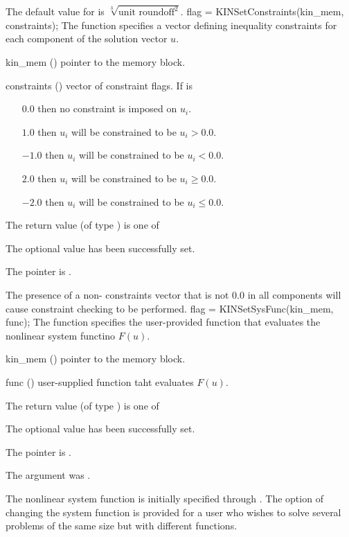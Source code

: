 {
  The default value for \id{} is $\sqrt[3]{\text{unit roundoff}^2}$.
}
{
flag = KINSetConstraints(kin\_mem, constraints);
}
{
  The function  specifies a vector defining
  inequality constraints for each component of the solution vector $u$.
}
{
  \begin{args}[constraints]
  \item[kin\_mem] ()
    pointer to the {\kinsol} memory block.
  \item[constraints] ()
    vector of constraint flags. If  is
    \begin{itemize}    
    \item[$0.0$] then no constraint is imposed on $u_i$. 
    \item[$1.0$] then $u_i$ will be constrained to be $u_i > 0.0$.
    \item[$-1.0$] then $u_i$ will be constrained to be $u_i < 0.0$.
    \item[$2.0$] then $u_i$ will be constrained to be $u_i \ge 0.0$.
    \item[$-2.0$] then $u_i$ will be constrained to be $u_i \le 0.0$.
    \end{itemize}
  \end{args}
}
{
  The return value  (of type ) is one of
  \begin{args}
  \item[\Id{KIN\_SUCCESS}] 
    The optional value has been successfully set.
  \item[\Id{KIN\_MEM\_NULL}]
    The  pointer is .
  \end{args}
}
{
  The presence of a non- constraints vector that is not $0.0$ in
  all components will cause constraint checking to be performed.
}
{
flag = KINSetSysFunc(kin\_mem, func);
}
{
  The function  specifies the user-provided function
  that evaluates the nonlinear system functino $F(u)$.
}
{
  \begin{args}
  \item[kin\_mem] ()
    pointer to the {\kinsol} memory block.
  \item[func] ()
    user-supplied function taht evaluates $F(u)$.
  \end{args}
}
{
  The return value  (of type ) is one of
  \begin{args}
  \item[\Id{KIN\_SUCCESS}] 
    The optional value has been successfully set.
  \item[\Id{KIN\_MEM\_NULL}]
    The  pointer is .
  \item[\Id{KIN\_ILL\_INPUT}]
    The argument  was .
  \end{args}
}
{
  The nonlinear system function is initially specified through .
  The option of changing the system function is provided for a user who wishes 
  to solve several problems of the same size but with different functions.
}


